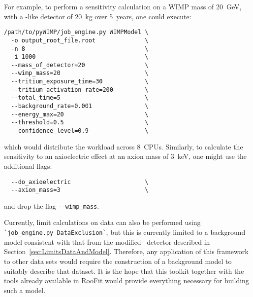For example, to perform a sensitivity calculation on a WIMP mass of 20~GeV, with a \MJ-like detector
of 20~kg over 5~years, one could execute:
				\begin{lstlisting}
/path/to/pyWIMP/job_engine.py WIMPModel	\
  -o output_root_file.root 				\
  -n 8 									\
  -i 1000 								\
  --mass_of_detector=20 				\
  --wimp_mass=20 						\
  --tritium_exposure_time=30			\
  --tritium_activation_rate=200			\
  --total_time=5 						\
  --background_rate=0.001 				\
  --energy_max=20 						\
  --threshold=0.5 						\ 
  --confidence_level=0.9 				\
				\end{lstlisting}
which would distribute the workload across 8~CPUs.  Similarly, to calculate the sensitivity to an axioelectric effect at an axion
mass of 3~keV, one might use the additional flags:
				\begin{lstlisting}
  --do_axioelectric						\
  --axion_mass=3 						\
				\end{lstlisting}
and drop the flag \lstinline!--wimp_mass!.  

Currently, limit calculations on data can also be performed using \lstinline!`job_engine.py DataExclusion`!, but this is currently limited
to a background model consistent with that from the modified-\bege~detector described in Section~\ref{sec:LimitsDataAndModel}.  Therefore, any application of this framework to other data sets would require the construction of a background model to suitably 
describe that dataset.  It is the hope that this toolkit together with the tools already available in RooFit would provide
everything necessary for building such a model.
